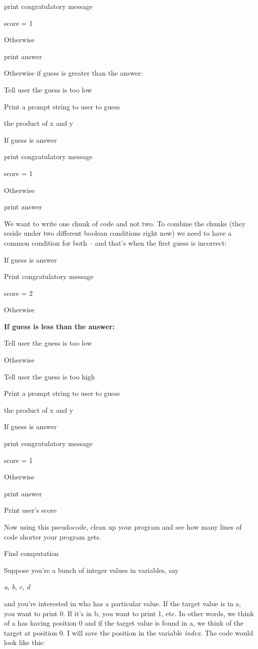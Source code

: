 \documentclass[
]{article}
\begin{document}
print congratulatory message

score = 1

Otherwise

print answer

Otherwise if guess is greater than the answer:

Tell user the guess is too low

Print a prompt string to user to guess

the product of x and y

If guess is answer

print congratulatory message

score = 1

Otherwise

print answer

We want to write one chunk of code and not two. To combine the chunks
(they reside under two different boolean conditions right now) we need
to have a common condition for both -- and that's when the first guess
is incorrect:

If guess is answer

Print congratulatory message

score = 2

Otherwise

\textbf{If guess is less than the answer:}

Tell user the guess is too low

Otherwise

Tell user the guess is too high

Print a prompt string to user to guess

the product of x and y

If guess is answer

print congratulatory message

score = 1

Otherwise

print answer

Print user's score

Now using this pseudocode, clean up your program and see how many lines
of code shorter your program gets.

Find computation

Suppose you're a bunch of integer values in variables, say

\emph{a}, \emph{b}, \emph{c}, \emph{d}

and you're interested in who has a particular value. If the target value
is in a, you want to print 0. If it's in b, you want to print 1, etc. In
other words, we think of a has having position 0 and if the target value
is found in a, we think of the target at position 0. I will save the
position in the variable \emph{index}. The code would look like this:
\end{document}
